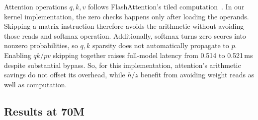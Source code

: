 Attention operations $q,k,v$ follows FlashAttention's tiled computation~\citep{dao2022flashattention}. In our kernel implementation, the zero checks happens only after loading the operands. Skipping a matrix instruction therefore avoids the arithmetic without avoiding those reads and softmax operation. Additionally, softmax turns zero scores into nonzero probabilities, so $q,k$ sparsity does not automatically propagate to $p$. Enabling $qk/pv$ skipping together raises full-model latency from 0.514 to 0.521\,ms despite substantial bypass. So, for this implementation, attention's arithmetic savings do not offset its overhead, while $h/z$ benefit from avoiding weight reads as well as computation.


\subsection{Results at 70M}
\label{sec:quality-sparsity-results}




